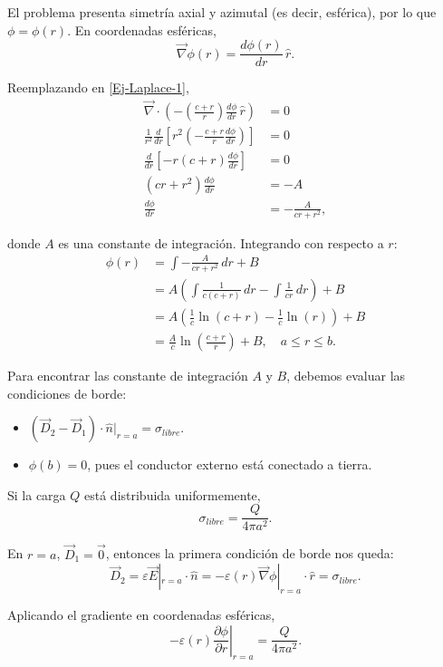 \begin{ejemplo}
El problema presenta simetría axial y azimutal (es decir, esférica), por lo que $\phi = \phi(r)$. En coordenadas esféricas,
$$\Vec{\nabla} \phi(r) = \frac{d \phi(r)}{d r}\,\hat{r}.$$

Reemplazando en \eqref{Ej-Laplace-1},
\begin{align*}
    \Vec{\nabla} \cdot \left( - \left( \frac{c+r}{r} \right) \frac{d \phi}{d r} \,\hat{r}\right) &= 0 \\
    \frac{1}{r^2} \frac{d}{d r} \left[ r^2 \left( - \frac{c+r}{r} \frac{d \phi}{d r} \right)\right] &= 0 \\
    \frac{d}{dr} \left[- r(c+r) \frac{d \phi}{dr} \right] &= 0 \\
    (cr + r^2) \frac{d\phi}{dr} &= -A \\
    \frac{d\phi}{dr} &= - \frac{A}{cr+r^2},
\end{align*}

donde $A$ es una constante de integración. Integrando con respecto a $r$:
\begingroup
\allowdisplaybreaks
\begin{align*}
    \phi(r) &= \int - \frac{A}{cr+r^2} \,dr + B \\
    &= A \left(  \int \frac{1}{c(c+r)} \,dr - \int \frac{1}{cr} \,dr \right) + B \\
    &= A \left( \frac{1}{c}\ln(c+r) - \frac{1}{c} \ln(r) \right) + B \\
    &= \frac{A}{c} \ln\left(\frac{c+r}{r} \right) + B, \quad a \leq r \leq b.
\end{align*}
\endgroup

Para encontrar las constante de integración $A$ y $B$, debemos evaluar las condiciones de borde:
\begin{itemize}
    \item $(\Vec{D}_2 - \Vec{D}_1) \cdot \hat{n}|_{r = a} = \sigma_{libre}$.
    
    \item $\phi(b) = 0$, pues el conductor externo está conectado a tierra.
\end{itemize}

Si la carga $Q$ está distribuida uniformemente, 
$$\sigma_{libre} = \frac{Q}{4\pi a^2}.$$

En $r = a$, $\Vec{D}_1 = \Vec{0}$, entonces la primera condición de borde nos queda:
$$\Vec{D}_2 = \varepsilon \Vec{E}|_{r=a} \cdot \hat{n} = - \varepsilon(r) \Vec{\nabla} \phi|_{r = a}  \cdot \hat{r} = \sigma_{libre}.$$

Aplicando el gradiente en coordenadas esféricas, 
$$-\varepsilon(r) \left. \frac{\partial \phi}{\partial r} \right|_{r = a} =\frac{Q}{4\pi a^2}.$$


\end{ejemplo}
